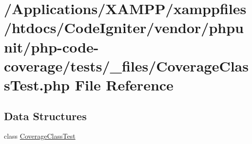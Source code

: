 \hypertarget{php-code-coverage_2tests_2__files_2_coverage_class_test_8php}{}\section{/\+Applications/\+X\+A\+M\+P\+P/xamppfiles/htdocs/\+Code\+Igniter/vendor/phpunit/php-\/code-\/coverage/tests/\+\_\+files/\+Coverage\+Class\+Test.php File Reference}
\label{php-code-coverage_2tests_2__files_2_coverage_class_test_8php}
\subsection*{Data Structures}
\begin{DoxyCompactItemize}
\item 
class \mbox{\hyperlink{class_coverage_class_test}{Coverage\+Class\+Test}}
\end{DoxyCompactItemize}
